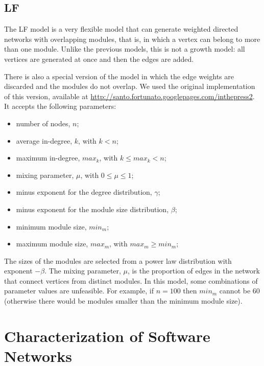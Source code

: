 \subsection{LF}

The LF model \cite{Lancichinetti2009} is a very flexible model that can
generate weighted directed networks with overlapping modules, that is, in which
a vertex can belong to more than one module. Unlike the previous models, this is
not a growth model: all vertices are generated at once and then the edges are
added.

There is also a special version of the model in which the edge weights are
discarded and the modules do not overlap. We used the original implementation of
this version, available at
\url{http://santo.fortunato.googlepages.com/inthepress2}. It accepts the
following parameters:

\begin{itemize}
\item number of nodes, $n$;
\item average in-degree, $k$, with $k < n$;
\item maximum in-degree, $max_k$, with $k \le max_k < n$;
\item mixing parameter, $\mu$, with $0 \le \mu \le 1$;
\item minus exponent for the degree distribution, $\gamma$;
\item minus exponent for the module size distribution, $\beta$;
\item minimum module size, $min_m$;
\item maximum module size, $max_m$, with $max_m \ge min_m$;
\end{itemize}

The sizes of the modules are selected from a power law distribution with
exponent $-\beta$. The mixing parameter, $\mu$, is the proportion of edges in the
network that connect vertices from distinct modules. In this model, some
combinations of parameter values are unfeasible. For example, if $n = 100$ then
$min_m$ cannot be 60 (otherwise there would be modules smaller than the minimum
module size).


\section{Characterization of Software Networks} \label{sec:characterization}

